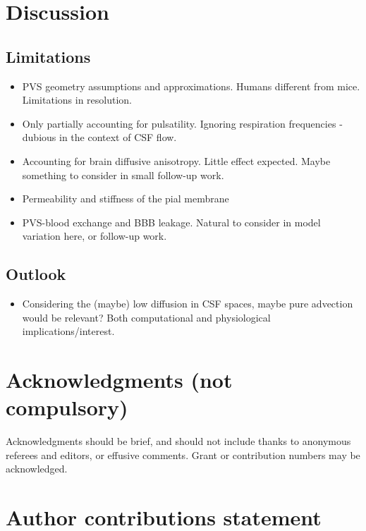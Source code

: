 \documentclass[fleqn,10pt]{wlscirep}
\begin{document}
\section*{Discussion}

\subsection*{Limitations}

\begin{itemize}
\item
  PVS geometry assumptions and approximations. Humans different from mice. Limitations in resolution.
\item
  Only partially accounting for pulsatility. Ignoring respiration frequencies - dubious in the context of CSF flow.
\item
  Accounting for brain diffusive anisotropy. Little effect expected. Maybe something to consider in small follow-up work.
\item
  Permeability and stiffness of the pial membrane
\item
  PVS-blood exchange and BBB leakage. Natural to consider in model variation here, or follow-up work.
\end{itemize}

\subsection*{Outlook}

\begin{itemize}
\item
  Considering the (maybe) low diffusion in CSF spaces, maybe pure
  advection would be relevant? Both computational and physiological
  implications/interest.
\end{itemize}



\newpage
\section*{Acknowledgments (not compulsory)}

Acknowledgments should be brief, and should not include thanks to anonymous referees and editors, or effusive comments. Grant or contribution numbers may be acknowledged.

\section*{Author contributions statement}
\end{document}
